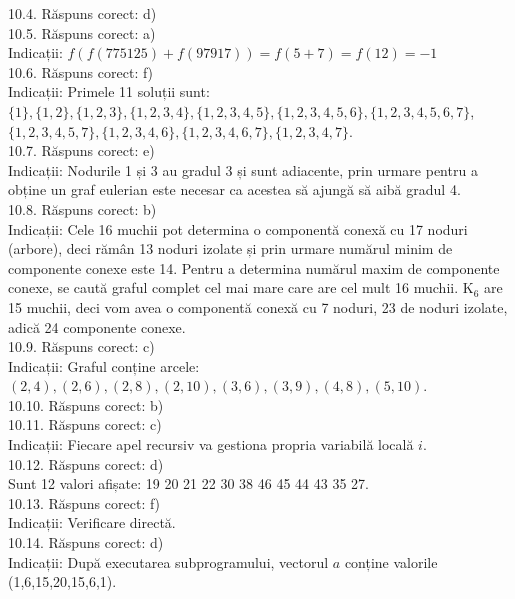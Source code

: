 10.4. Răspuns corect: d)\\

10.5. Răspuns corect: a)\\
Indicații: $f(f(775125)+f(97917))=f(5+7)=f(12)=-1$\\

10.6. Răspuns corect: f)\\
Indicații: Primele 11 soluții sunt: $\{1\},\{1,2\},\{1,2,3\},\{1,2,3,4\},\{1,2,3,4,5\},\{1,2,3,4,5,6\},\{1,2,3,4,5,6,7\}$,\\ $\{1,2,3,4,5,7\},\{1,2,3,4,6\},\{1,2,3,4,6,7\},\{1,2,3,4,7\}$.\\

10.7. Răspuns corect: e)\\
Indicații: Nodurile 1 și 3 au gradul 3 și sunt adiacente, prin urmare pentru a obține un graf eulerian este necesar ca acestea să ajungă să aibă gradul 4.\\

10.8. Răspuns corect: b)\\
Indicații: Cele 16 muchii pot determina o componentă conexă cu 17 noduri (arbore), deci rămân 13 noduri izolate și prin urmare numărul minim de componente conexe este 14. Pentru a determina numărul maxim de componente conexe, se caută graful complet cel mai mare care are cel mult 16 muchii. $\mathrm{K}_{6}$ are 15 muchii, deci vom avea o componentă conexă cu 7 noduri, 23 de noduri izolate, adică 24 componente conexe.\\

10.9. Răspuns corect: c)\\
Indicații: Graful conține arcele: $(2,4),(2,6),(2,8),(2,10),(3,6),(3,9),(4,8),(5,10)$.\\

10.10. Răspuns corect: b)\\

10.11. Răspuns corect: c)\\
Indicații: Fiecare apel recursiv va gestiona propria variabilă locală $i$.\\

10.12. Răspuns corect: d)\\
Sunt 12 valori afișate: 19 20 21 22 30 38 46 45 44 43 35 27.\\

10.13. Răspuns corect: f)\\
Indicații: Verificare directă.\\

10.14. Răspuns corect: d)\\
Indicații: După executarea subprogramului, vectorul $a$ conține valorile (1,6,15,20,15,6,1).\\

